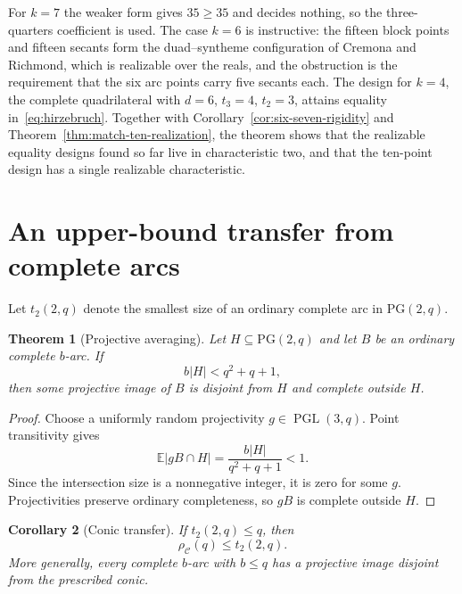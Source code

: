 \documentclass[11pt]{article}
\newtheorem{theorem}{Theorem}[section]
\newtheorem{corollary}[theorem]{Corollary}
\theoremstyle{definition}
\theoremstyle{remark}
\newcommand{\PG}{\mathrm{PG}}
\newcommand{\cC}{\mathcal{C}}
\newcommand{\rhoC}{\rho_{\cC}}
\begin{document}
For \(k=7\) the weaker form gives \(35\ge35\) and decides nothing, so the
three-quarters coefficient is used.  The case \(k=6\) is instructive: the
fifteen block points and fifteen secants form the duad--syntheme
configuration of Cremona and Richmond, which is realizable over the reals,
and the obstruction is the requirement that the six arc points carry five
secants each.  The design for \(k=4\), the complete quadrilateral with
\(d=6\), \(t_3=4\), \(t_2=3\), attains equality in~\eqref{eq:hirzebruch}.
Together with Corollary~\ref{cor:six-seven-rigidity} and
Theorem~\ref{thm:match-ten-realization}, the theorem shows that the
realizable equality designs found so far live in characteristic two, and
that the ten-point design has a single realizable characteristic.

\section{An upper-bound transfer from complete arcs}
\label{sec:transfer}

Let $t_2(2,q)$ denote the smallest size of an ordinary complete arc in
$\PG(2,q)$.

\begin{theorem}[Projective averaging]
\label{thm:transfer}
Let $H\subseteq\PG(2,q)$ and let $B$ be an ordinary complete $b$-arc.  If
\begin{equation}
 b|H|<q^2+q+1,
\label{eq:transfer-general}
\end{equation}
then some projective image of $B$ is disjoint from $H$ and complete outside
$H$.
\end{theorem}

\begin{proof}
Choose a uniformly random projectivity $g\in\operatorname{PGL}(3,q)$.
Point transitivity gives
\[
 \mathbb E|gB\cap H|=\frac{b|H|}{q^2+q+1}<1.
\]
Since the intersection size is a nonnegative integer, it is zero for some
$g$.  Projectivities preserve ordinary completeness, so $gB$ is complete
outside $H$.
\end{proof}

\begin{corollary}[Conic transfer]
\label{cor:conic-transfer}
If $t_2(2,q)\le q$, then
\begin{equation}
 \rhoC(q)\le t_2(2,q).
\label{eq:transfer}
\end{equation}
More generally, every complete $b$-arc with $b\le q$ has a projective image
disjoint from the prescribed conic.
\end{corollary}
\end{document}
